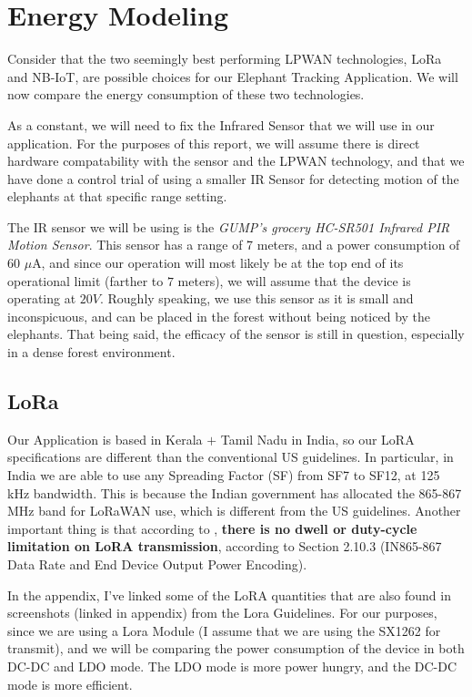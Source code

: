 \section{Energy Modeling}
\label{sec:EnergyModeling}
Consider that the two seemingly best performing LPWAN technologies, LoRa and NB-IoT, are possible choices for our Elephant Tracking Application. We will now compare the energy consumption of these two technologies. 

As a constant, we will need to fix the Infrared Sensor that we will use in our application. For the purposes of this report, we will assume there is direct hardware compatability with the sensor and the LPWAN technology, and that we have done a control trial of using a smaller IR Sensor for detecting motion of the elephants at that specific range setting. 

The IR sensor we will be using is the \textit{GUMP's grocery HC-SR501 Infrared PIR Motion Sensor}\cite{GumpSensor}. This sensor has a range of 7 meters, and a power consumption of 60 $\mu$A, and since our operation will most likely be at the top end of its operational limit (farther to $7$ meters), we will assume that the device is operating at $20V$. Roughly speaking, we use this sensor as it is small and inconspicuous, and can be placed in the forest without being noticed by the elephants. That being said, the efficacy of the sensor is still in question, especially in a dense forest environment.\\
% 
\subsection{LoRa}
\label{sec:LoRa}
Our Application is based in Kerala $ + $ Tamil Nadu in India, so our LoRA specifications are different than the conventional US guidelines. In particular, in India we are able to use any Spreading Factor (SF) from SF7 to SF12, at 125 kHz bandwidth. This is because the Indian government has allocated the 865-867 MHz band for LoRaWAN use, which is different from the US guidelines. Another important thing is that according to \cite{loraGuidelines}, \textbf{there is no dwell or duty-cycle limitation on LoRA transmission}, according to Section 2.10.3 (IN865-867 Data Rate and End Device Output Power Encoding).


In the appendix, I've linked some of the LoRA quantities that are also found in screenshots (linked in appendix) from the Lora Guidelines. For our purposes, since we are using a Lora Module (I assume that we are using the SX1262 for transmit), and we will be comparing the power consumption of the device in both DC-DC and LDO mode. The LDO mode is more power hungry, and the DC-DC mode is more efficient. 

